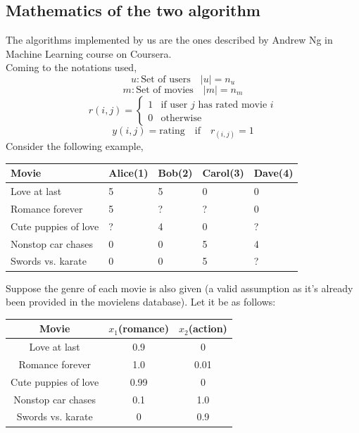 \documentclass[twocolumn]{article}
\begin{document}
\subsection*{Mathematics of the two algorithm}
The algorithms implemented by us are the ones described by Andrew Ng in Machine Learning course on Coursera.\\
\newline
Coming to the notations used,\\
\newline
$$u : \text{Set of users}\quad|u|=n_u$$
$$m : \text{Set of movies}\quad|m|=n_m$$
$$
r(i,j) = 
  \begin{cases}
    1 & \text{if user $j$ has rated movie $i$}\\
    0 & \text{otherwise}
  \end{cases}
$$
$$y(i,j)=\text{rating}\quad \text{if} \quad r_{(i,j)}=1$$
Consider the following example,\\
\newline
\begin{tabular}{| p{2cm} | p{1cm} | p{1cm} | p{1cm} | p{1cm}|}
\hline
Movie & Alice(1) & Bob(2) & Carol(3) & Dave(4)\\\hline
Love at last & 5 & 5 & 0 & 0\\\hline
Romance forever & 5 & ? & ? & 0\\\hline
Cute puppies of love & ? & 4 & 0 & ?\\\hline
Nonstop car chases & 0 & 0 & 5 & 4\\\hline
Swords vs. karate & 0 & 0 & 5 & ?\\\hline
\end{tabular}
\newline
\newline
Suppose the genre of each movie is also given (a valid assumption as it's already been provided in the movielens database). Let it be as follows:
\begin{center}
\begin{tabular}{| c | c | c |}
\hline
Movie & $x_1$(romance) & $x_2$(action)\\\hline
Love at last & 0.9 & 0\\\hline
Romance forever & 1.0 & 0.01\\\hline
Cute puppies of love & 0.99 & 0\\\hline
Nonstop car chases & 0.1 & 1.0\\\hline
Swords vs. karate & 0 & 0.9\\\hline
\end{tabular}
\end{center}
\end{document}
